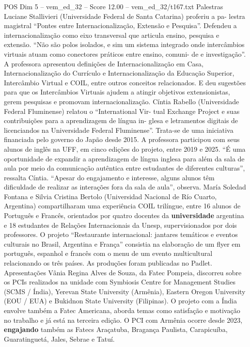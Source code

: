 \begin{textsample}{POS Dim 5 – vem\_ed\_32 – Score 12.00 – vem\_ed\_32/t167.txt}
Palestras Luciane Stallivieri (Universidade Federal de Santa Catarina) proferiu a pa- lestra magistral “Pontes entre Internacionalização, Extensão e Pesquisa”.
Defendeu a internacionalização como eixo transversal que articula ensino, pesquisa e extensão. “Não são polos isolados, e sim um sistema integrado onde intercâmbios virtuais atuam como conectores práticos entre ensino, comuni- de e investigação”.
A professora apresentou definições de Internacionalização em Casa, Internacionalização do Currículo e Internacionalização da Educação Superior, Intercâmbio Virtual e COIL, entre outros conceitos relacionados.
E deu sugestões para que os Intercâmbios Virtuais ajudem a atingir objetivos extensionistas, gerem pesquisas e promovam internacionalização.
Cíntia Rabello (Universidade Federal Fluminense) relatou o “International Vir- tual Exchange Project e suas contribuições para a aprendizagem de língua in- glesa e letramentos digitais de licenciandos na Universidade Federal Fluminense”.
Trata-se de uma iniciativa financiada pelo governo do Japão desde 2015.
A professora participou com seus alunos de inglês na UFF, em cinco edições do projeto, entre 2019 e 2025. “É uma oportunidade de expandir a aprendizagem de língua inglesa para além da sala de aula por meio da comunicação autêntica entre estudantes de diferentes culturas”, ressalta Cíntia. “Apesar do engajamento e interesse, alguns alunos têm dificuldade de realizar as interações fora da sala de aula”, observa.
María Soledad Fontana e Silvia Cristina Bertolo (Universidad Nacional de Río Cuarto, Argentina) compartilharam uma experiência COIL trilíngue, entre 16 alunos de Português e Francês, orientados por quatro docentes da \textbf{universidade} argentina e 18 estudantes de Relações Internacionais da Unesp, supervisionados por dois professores.
O projeto “Restaurante internacional: jantares temáticos e eventos culturais no Brasil, Argentina e França” consistia na elaboração de um flyer em português, espanhol e francês com o menu de um evento multicultural relacionando os três países.
As produções foram publicadas no Padlet.
Apresentações Vânia Regina Alves de Souza, da Fatec Pompeia, discorreu sobre os PCIs realizados na unidade com Symbiosis Centre for Management Studies (SCMS / Índia), Yerevan State University (Armênia), Eastern Oregon University (EOU / EUA) e Bukidnon State University (Filipinas).
O projeto com a Índia envolve também a Fatec Americana, aborda temas como satisfação e motivação no trabalho e já está na terceira edição.
O PCI com Armênia ocorre desde 2023, \textbf{engajando} também as Fatecs Araçatuba, Bragança Paulista, Carapicuíba, Guaratinguetá, Jales, Sebrae e Tatuí.

\end{textsample}
